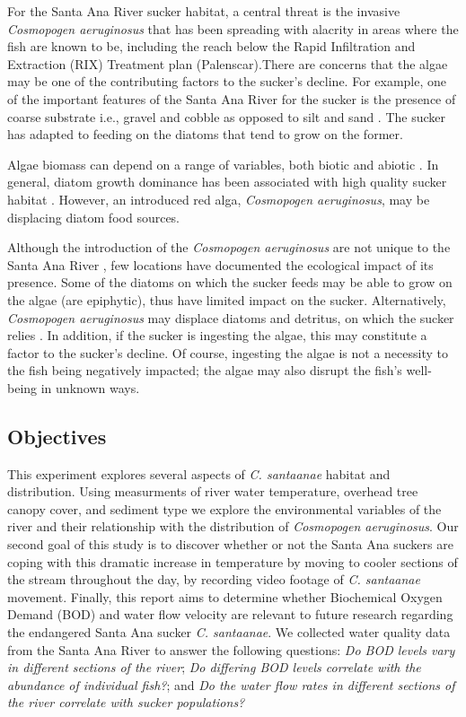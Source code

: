\documentclass{article}\usepackage[]{graphicx}\usepackage[]{color}
\begin{document}
For the Santa Ana River sucker habitat, a central threat is the invasive \emph{Cosmopogen aeruginosus} that has been spreading with alacrity in areas where the fish are known to be, including the reach below the Rapid Infiltration and Extraction (RIX) Treatment plan (Palenscar).There are concerns that the algae may be one of the contributing factors to the sucker's decline. For example, one of the important features of the Santa Ana River for the sucker is the presence of coarse substrate i.e., gravel and cobble as opposed to silt and sand \citep{thompson2010influence}. The sucker has adapted to feeding on the diatoms that tend to grow on the former. 

Algae biomass can depend on a range of variables, both biotic and abiotic \citep{winkelmann2014top}. In general, diatom growth dominance has been associated with high quality sucker habitat \citep{REF}. However, an introduced red alga, \emph{Cosmopogen aeruginosus}, may be displacing diatom food sources. 

Although the introduction of the \emph{Cosmopogen aeruginosus} are not unique to the Santa Ana River \citep{vzakova2013new}, few locations have documented the ecological impact of its presence. Some of the diatoms on which the sucker feeds may be able to grow on the algae (are epiphytic), thus have limited impact on the sucker. Alternatively, \emph{Cosmopogen aeruginosus} may displace diatoms and detritus, on which the sucker relies \citep{thompson2010influence}. In addition, if the sucker is ingesting the algae, this may constitute a factor to the sucker's decline. Of course, ingesting the algae is not a necessity to the fish being negatively impacted; the algae may also disrupt the fish's well-being in unknown ways. 

\subsection{Objectives}
This experiment explores several aspects of \emph{C. santaanae} habitat and distribution. Using measurments of river water temperature, overhead tree canopy cover, and sediment type we explore the environmental variables of the river and their relationship with the distribution of \emph{Cosmopogen aeruginosus}. Our second goal of this study is to discover whether or not the Santa Ana suckers are coping with this dramatic increase in temperature by moving to cooler sections of the stream throughout the day, by recording video footage of \emph{C. santaanae} movement. Finally, this report aims to determine whether Biochemical Oxygen Demand (BOD) and water flow velocity are relevant to future research regarding the endangered Santa Ana sucker \emph{C. santaanae}. We collected water quality data from the Santa Ana River to answer the following questions: \emph{Do BOD levels vary in different sections of the river}; \emph{Do differing BOD levels correlate with the abundance of individual fish?}; and \emph{Do the water flow rates in different sections of the river correlate with sucker populations?}
\end{document}
